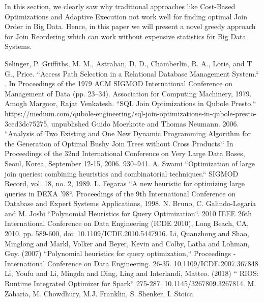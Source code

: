 \documentclass[conference]{IEEEtran}
\begin{document}





In this section, we clearly saw why traditional approaches like Cost-Based Optimizations and Adaptive Execution not work well for finding optimal Join Order in Big Data. Hence, in this paper we will present a novel greedy approach for Join Reordering which can work without expensive statistics for Big Data Systems.






\begin{thebibliography}{00}
 Selinger, P. Griffiths, M. M., Astrahan, D. D., Chamberlin, R. A., Lorie, and T. G., Price. ``Access Path Selection in a Relational Database Management System.`` . In Proceedings of the 1979 ACM SIGMOD International Conference on Management of Data (pp. 23–34). Association for Computing Machinery, 1979.
 Amogh Margoor, Rajat Venkatesh. ``SQL Join Optimizations in Qubole Presto,``
https://medium.com/qubole-engineering/sql-join-optimizations-in-qubole-presto-3ced3dc75275, unpublished
 Guido Moerkotte and Thomas Neumann. 2006. ``Analysis of Two Existing and One New Dynamic Programming Algorithm for the Generation of Optimal Bushy Join Trees without Cross Products.`` In Proceedings of the 32nd International Conference on Very Large Data Bases, Seoul, Korea, September 12-15, 2006. 930–941.
 A. Swami ``Optimization of large join queries: combining heuristics and
combinatorial techniques.`` SIGMOD Record, vol. 18, no. 2, 1989.
 L. Fegaras ``A new heuristic for optimizing large queries in DEXA ’98``. Proceedings of the 9th International Conference on Database and Expert Systems Applications, 1998.
 N. Bruno, C. Galindo-Legaria and M. Joshi ``Polynomial Heuristics for Query Optimization``. 2010 IEEE 26th International Conference on Data Engineering (ICDE 2010), Long Beach, CA, 2010, pp. 589-600, doi: 10.1109/ICDE.2010.5447916.
 Li, Quanzhong and Shao, Minglong and Markl, Volker and Beyer, Kevin and Colby, Latha and Lohman, Guy. (2007)  ``Polynomial heuristics for query optimization,`` Proceedings - International Conference on Data Engineering. 26-35. 10.1109/ICDE.2007.367848.
 Li, Youfu and Li, Mingda and Ding, Ling and Interlandi, Matteo. (2018)  `` RIOS: Runtime Integrated Optimizer for Spark`` 275-287. 10.1145/3267809.3267814.
 M. Zaharia, M. Chowdhury, M.J. Franklin, S. Shenker, I. Stoica

\end{thebibliography}
\end{document}
